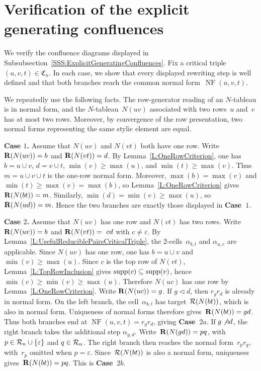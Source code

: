 \documentclass[a4paper, twoside, 11pt, english]{article}
\begin{document}
\appendix

\section{Verification of the explicit generating confluences}
\label{A:ExplicitGeneratingConfluences}

We verify the confluence diagrams displayed in Subsubsection~\ref{SSS:ExplicitGeneratingConfluences}. Fix a critical triple~$(u,v,t)\in\mathfrak C_n$. In each case, we show that every displayed rewriting step is well defined and that both branches reach the common normal form~$\operatorname{NF}(u,v,t)$.

We repeatedly use the following facts. The row-generator reading of an
$N$-tableau is in normal form, and the $N$-tableau~$N(uv)$ associated
with two rows~$u$ and~$v$ has at most two rows. Moreover, by convergence
of the row presentation, two normal forms representing the same stylic
element are equal.
\medskip

\noindent
\textbf{Case $1$.}
Assume that $N(uv)$ and $N(vt)$ both have one row. Write
$\mathbf{R}(N(uv))=b$ and $\mathbf{R}(N(vt))=d$. By Lemma~\ref{L:OneRowCriterion},
one has $b=u\cup v$, $d=v\cup t$, $\min(v)\ge\max(u)$, and
$\min(t)\ge\max(v)$. Thus $m=u\cup v\cup t$ is the one-row normal form.
Moreover, $\max(b)=\max(v)$ and $\min(t)\ge\max(v)=\max(b)$, so
Lemma~\ref{L:OneRowCriterion} gives $\mathbf{R}(N(bt))=m$. Similarly,
$\min(d)=\min(v)\ge\max(u)$, so $\mathbf{R}(N(ud))=m$. Hence the two branches are
exactly those displayed in \textbf{Case~$1$}.

\medskip

\noindent
\textbf{Case $2$.}
Assume that $N(uv)$ has one row and $N(vt)$ has two rows. Write
$\mathbf{R}(N(uv))=b$ and $\mathbf{R}(N(vt))=~cd$ with $c\neq\varepsilon$. By
Lemma~\ref{L:UsefulReduciblePairsCriticalTriple}, the $2$-cells~$\alpha_{b,t}$
and $\alpha_{u,c}$ are applicable. Since $N(uv)$ has one row, one has
$b=u\cup v$ and $\min(v)\ge\max(u)$. Since $c$ is the top row of $N(vt)$,
Lemma~\ref{L:TopRowInclusion} gives $\operatorname{supp}(c)\subseteq\operatorname{supp}(v)$, hence
$\min(c)\ge\min(v)\ge\max(u)$. Therefore $N(uc)$ has one row by
Lemma~\ref{L:OneRowCriterion}. Write $\mathbf{R}(N(uc))=g$.
If $g\triangleleft d$, then $r_g r_d$ is already in normal form. On the
left branch, the cell~$\alpha_{b,t}$ has target~$\mathcal{R}(N(bt))$, which is also
in normal form.
Uniqueness of normal forms therefore gives~$\mathbf{R}(N(bt))=gd$.
Thus both branches end at
$\operatorname{NF}(u,v,t)=r_g r_d$, giving \textbf{Case~$2a$}.
If $g\not\triangleleft d$, the right branch takes the additional step
$\alpha_{g,d}$. Write~$\mathbf{R}(N(gd))=pq$,
with $p\in\mathcal{R}_n\cup\{\varepsilon\}$ and $q\in\mathcal{R}_n$. The right branch then
reaches the normal form~$r_p r_q$, with~$r_p$ omitted when
$p=\varepsilon$. Since~$\mathcal{R}(N(bt))$ is also a normal form, uniqueness gives~$\mathbf{R}(N(bt))=pq$.
This is \textbf{Case~$2b$}.
\end{document}

